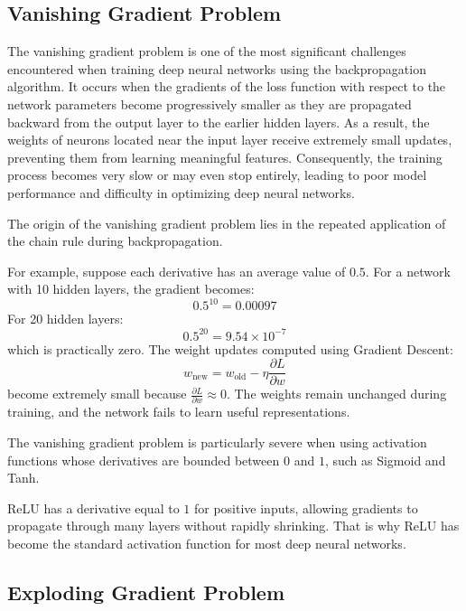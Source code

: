\subsection{Vanishing Gradient Problem}

The vanishing gradient problem is one of the most significant challenges encountered when training deep neural networks using the backpropagation algorithm. It occurs when the gradients of the loss function with respect to the network parameters become progressively smaller as they are propagated backward from the output layer to the earlier hidden layers. As a result, the weights of neurons located near the input layer receive extremely small updates, preventing them from learning meaningful features. Consequently, the training process becomes very slow or may even stop entirely, leading to poor model performance and difficulty in optimizing deep neural networks.

The origin of the vanishing gradient problem lies in the repeated application of the chain rule during backpropagation.

For example, suppose each derivative has an average value of $0.5$. For a network with 10 hidden layers, the gradient becomes:
\begin{equation}
0.5^{10} = 0.00097
\end{equation}
For 20 hidden layers:
\begin{equation}
0.5^{20} = 9.54 \times 10^{-7}
\end{equation}
which is practically zero. The weight updates computed using Gradient Descent:
\begin{equation}
w_{\text{new}} = w_{\text{old}} - \eta \frac{\partial L}{\partial w}
\end{equation}
become extremely small because $\frac{\partial L}{\partial w} \approx 0$. The weights remain unchanged during training, and the network fails to learn useful representations.

The vanishing gradient problem is particularly severe when using activation functions whose derivatives are bounded between $0$ and $1$, such as Sigmoid and Tanh.

ReLU has a derivative equal to $1$ for positive inputs, allowing gradients to propagate through many layers without rapidly shrinking. That is why ReLU has become the standard activation function for most deep neural networks.

\subsection{Exploding Gradient Problem}

